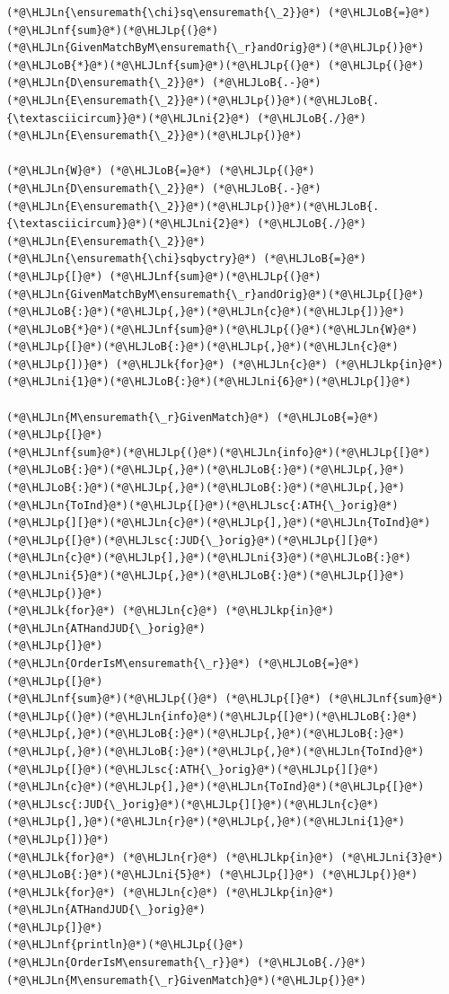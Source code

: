 \documentclass[12pt,a4paper]{article}
\newcommand{\HLJLk}[1]{\textcolor[RGB]{148,91,176}{\textbf{#1}}}
\newcommand{\HLJLkp}[1]{\textcolor[RGB]{148,91,176}{\textbf{#1}}}
\newcommand{\HLJLn}[1]{#1}
\newcommand{\HLJLnf}[1]{\textcolor[RGB]{66,102,213}{#1}}
\newcommand{\HLJLsc}[1]{\textcolor[RGB]{201,61,57}{#1}}
\newcommand{\HLJLni}[1]{\textcolor[RGB]{59,151,46}{#1}}
\newcommand{\HLJLoB}[1]{\textcolor[RGB]{102,102,102}{\textbf{#1}}}
\newcommand{\HLJLp}[1]{#1}
\begin{document}
\begin{lstlisting}
(*@\HLJLn{\ensuremath{\chi}sq\ensuremath{\_2}}@*) (*@\HLJLoB{=}@*) (*@\HLJLnf{sum}@*)(*@\HLJLp{(}@*)(*@\HLJLn{GivenMatchByM\ensuremath{\_r}andOrig}@*)(*@\HLJLp{)}@*)(*@\HLJLoB{*}@*)(*@\HLJLnf{sum}@*)(*@\HLJLp{(}@*) (*@\HLJLp{(}@*)(*@\HLJLn{D\ensuremath{\_2}}@*) (*@\HLJLoB{.-}@*) (*@\HLJLn{E\ensuremath{\_2}}@*)(*@\HLJLp{)}@*)(*@\HLJLoB{.{\textasciicircum}}@*)(*@\HLJLni{2}@*) (*@\HLJLoB{./}@*) (*@\HLJLn{E\ensuremath{\_2}}@*)(*@\HLJLp{)}@*)

(*@\HLJLn{W}@*) (*@\HLJLoB{=}@*) (*@\HLJLp{(}@*)(*@\HLJLn{D\ensuremath{\_2}}@*) (*@\HLJLoB{.-}@*) (*@\HLJLn{E\ensuremath{\_2}}@*)(*@\HLJLp{)}@*)(*@\HLJLoB{.{\textasciicircum}}@*)(*@\HLJLni{2}@*) (*@\HLJLoB{./}@*) (*@\HLJLn{E\ensuremath{\_2}}@*)
(*@\HLJLn{\ensuremath{\chi}sqbyctry}@*) (*@\HLJLoB{=}@*) (*@\HLJLp{[}@*) (*@\HLJLnf{sum}@*)(*@\HLJLp{(}@*)(*@\HLJLn{GivenMatchByM\ensuremath{\_r}andOrig}@*)(*@\HLJLp{[}@*)(*@\HLJLoB{:}@*)(*@\HLJLp{,}@*)(*@\HLJLn{c}@*)(*@\HLJLp{])}@*)(*@\HLJLoB{*}@*)(*@\HLJLnf{sum}@*)(*@\HLJLp{(}@*)(*@\HLJLn{W}@*)(*@\HLJLp{[}@*)(*@\HLJLoB{:}@*)(*@\HLJLp{,}@*)(*@\HLJLn{c}@*)(*@\HLJLp{])}@*) (*@\HLJLk{for}@*) (*@\HLJLn{c}@*) (*@\HLJLkp{in}@*) (*@\HLJLni{1}@*)(*@\HLJLoB{:}@*)(*@\HLJLni{6}@*)(*@\HLJLp{]}@*)

(*@\HLJLn{M\ensuremath{\_r}GivenMatch}@*) (*@\HLJLoB{=}@*)(*@\HLJLp{[}@*)
(*@\HLJLnf{sum}@*)(*@\HLJLp{(}@*)(*@\HLJLn{info}@*)(*@\HLJLp{[}@*)(*@\HLJLoB{:}@*)(*@\HLJLp{,}@*)(*@\HLJLoB{:}@*)(*@\HLJLp{,}@*)(*@\HLJLoB{:}@*)(*@\HLJLp{,}@*)(*@\HLJLoB{:}@*)(*@\HLJLp{,}@*)(*@\HLJLn{ToInd}@*)(*@\HLJLp{[}@*)(*@\HLJLsc{:ATH{\_}orig}@*)(*@\HLJLp{][}@*)(*@\HLJLn{c}@*)(*@\HLJLp{],}@*)(*@\HLJLn{ToInd}@*)(*@\HLJLp{[}@*)(*@\HLJLsc{:JUD{\_}orig}@*)(*@\HLJLp{][}@*)(*@\HLJLn{c}@*)(*@\HLJLp{],}@*)(*@\HLJLni{3}@*)(*@\HLJLoB{:}@*)(*@\HLJLni{5}@*)(*@\HLJLp{,}@*)(*@\HLJLoB{:}@*)(*@\HLJLp{]}@*) (*@\HLJLp{)}@*)
(*@\HLJLk{for}@*) (*@\HLJLn{c}@*) (*@\HLJLkp{in}@*) (*@\HLJLn{ATHandJUD{\_}orig}@*)
(*@\HLJLp{]}@*)
(*@\HLJLn{OrderIsM\ensuremath{\_r}}@*) (*@\HLJLoB{=}@*) (*@\HLJLp{[}@*) 
(*@\HLJLnf{sum}@*)(*@\HLJLp{(}@*) (*@\HLJLp{[}@*) (*@\HLJLnf{sum}@*)(*@\HLJLp{(}@*)(*@\HLJLn{info}@*)(*@\HLJLp{[}@*)(*@\HLJLoB{:}@*)(*@\HLJLp{,}@*)(*@\HLJLoB{:}@*)(*@\HLJLp{,}@*)(*@\HLJLoB{:}@*)(*@\HLJLp{,}@*)(*@\HLJLoB{:}@*)(*@\HLJLp{,}@*)(*@\HLJLn{ToInd}@*)(*@\HLJLp{[}@*)(*@\HLJLsc{:ATH{\_}orig}@*)(*@\HLJLp{][}@*)(*@\HLJLn{c}@*)(*@\HLJLp{],}@*)(*@\HLJLn{ToInd}@*)(*@\HLJLp{[}@*)(*@\HLJLsc{:JUD{\_}orig}@*)(*@\HLJLp{][}@*)(*@\HLJLn{c}@*)(*@\HLJLp{],}@*)(*@\HLJLn{r}@*)(*@\HLJLp{,}@*)(*@\HLJLni{1}@*)(*@\HLJLp{])}@*)
(*@\HLJLk{for}@*) (*@\HLJLn{r}@*) (*@\HLJLkp{in}@*) (*@\HLJLni{3}@*)(*@\HLJLoB{:}@*)(*@\HLJLni{5}@*) (*@\HLJLp{]}@*) (*@\HLJLp{)}@*)
(*@\HLJLk{for}@*) (*@\HLJLn{c}@*) (*@\HLJLkp{in}@*) (*@\HLJLn{ATHandJUD{\_}orig}@*) 
(*@\HLJLp{]}@*)
(*@\HLJLnf{println}@*)(*@\HLJLp{(}@*)(*@\HLJLn{OrderIsM\ensuremath{\_r}}@*) (*@\HLJLoB{./}@*) (*@\HLJLn{M\ensuremath{\_r}GivenMatch}@*)(*@\HLJLp{)}@*)
\end{lstlisting}
\end{document}
